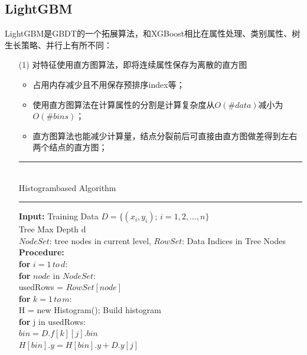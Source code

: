 \documentclass[a4paper]{article}
\begin{document}
	\subsection{LightGBM}
		LightGBM是GBDT的一个拓展算法，和XGBoost相比在属性处理、类别属性、树生长策略、并行上有所不同：
		\begin{itemize}
			\item[(1)] 对特征使用直方图算法，即将连续属性保存为离散的直方图
				\begin{itemize}
					\item 占用内存减少且不用保存预排序index等；
					\item 使用直方图算法在计算属性的分割是计算复杂度从$O(\#data)$减小为$O(\#bins)$；
					\item 直方图算法也能减少计算量，结点分裂前后可直接由直方图做差得到左右两个结点的直方图；
				\end{itemize}
			\noindent\rule[0.10\baselineskip]{\textwidth}{0.5pt}\\
			Histogram\-based Algorithm\\
			\noindent\rule[0.10\baselineskip]{\textwidth}{0.5pt}
					\textbf{Input:} Training Data $D=\{(x_i,y_i);\, i = 1,2,\dots, n\}$\\
					\hspace*{32pt} Tree Max Depth d\\
					\hspace*{32pt} $NodeSet$: tree nodes in current level, $RowSet$: Data Indices in Tree Nodes\\
					\textbf{Procedure:}\\
					\hspace*{32pt} \textbf{for} $i = 1\, to\, d$:\\
					\hspace*{48pt} \textbf{for} $node$ in $NodeSet$:\\
					\hspace*{64pt}	usedRows = $RowSet[node]$\\
					\hspace*{64pt}  \textbf{for} $k = 1\,to\,m$:\\
					\hspace*{80pt}	H = new Histogram(); Build histogram\\
					\hspace*{80pt}  \textbf{for} j in usedRows:\\
					\hspace*{96pt}  $bin = D.f[k][j].bin$\\
					\hspace*{96pt}  $H[bin].y = H[bin].y + D.y[j]$\\

\end{itemize}
\end{document}
